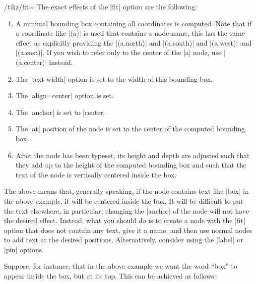 \begin{key}{/tikz/fit=}
    The exact effects of the |fit| option are the following:
    \begin{enumerate}
        \item A minimal bounding box containing all coordinates is computed.
            Note that if a coordinate like |(a)| is used that contains a node
            name, this has the same effect as explicitly providing the
            |(a.north)| and |(a.south)| and |(a.west)| and |(a.east)|. If you
            wish to refer only to the center of the |a| node, use  |(a.center)|
            instead.
        \item The |text width| option is set to the width of this bounding box.
        \item The |align=center| option is set.
        \item The |anchor| is set to |center|.
        \item The |at| position of the node is set to the center of the
            computed bounding box.
        \item After the node has been typeset, its height and depth are
            adjusted such that they add up to the height of the computed
            bounding box and such that the text of the node is vertically
            centered inside the box.
    \end{enumerate}
    The above means that, generally speaking, if the node contains text like
    |box| in the above example, it will be centered inside the box. It will be
    difficult to put the text elsewhere, in particular, changing the |anchor|
    of the node will not have the desired effect. Instead, what you should do
    is to create a node with the |fit| option that does not contain any text,
    give it a name, and then use normal nodes to add text at the desired
    positions. Alternatively, consider using the |label| or |pin| options.

    Suppose, for instance, that in the above example we want the word ``box''
    to appear inside the box, but at its top. This can be achieved as follows:
\begin{codeexample}[preamble={\usetikzlibrary{fit}}]
\end{codeexample}
\end{key}
